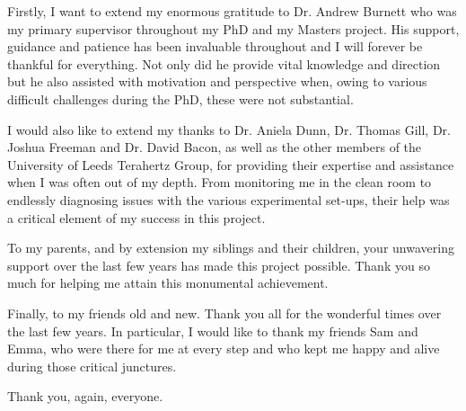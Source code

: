 Firstly, I want to extend my enormous gratitude to Dr. Andrew Burnett who was my primary supervisor throughout my PhD and my Masters project. His support, guidance and patience has been invaluable throughout and I will forever be thankful for everything. Not only did he provide vital knowledge and direction but he also assisted with motivation and perspective when, owing to various difficult challenges during the PhD, these were not substantial.

I would also like to extend my thanks to Dr. Aniela Dunn, Dr. Thomas Gill, Dr. Joshua Freeman and Dr. David Bacon, as well as the other members of the University of Leeds Terahertz Group, for providing their expertise and assistance when I was often out of my depth. From monitoring me in the clean room to endlessly diagnosing issues with the various experimental set-ups, their help was a critical element of my success in this project.

To my parents, and by extension my siblings and their children, your unwavering support over the last few years has made this project possible. Thank you so much for helping me attain this monumental achievement. 

Finally, to my friends old and new. Thank you all for the wonderful times over the last few years. In particular, I would like to thank my friends Sam and Emma, who were there for me at every step and who kept me happy and alive during those critical junctures. 

Thank you, again, everyone.
